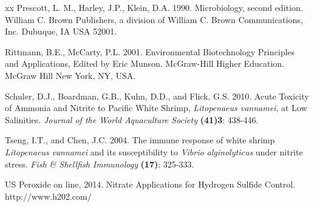 \documentclass[useAMS,usenatbib]{tellus}
\begin{document}
\begin{thebibliography}{xx}
Prescott, L. M., Harley, J.P., Klein, D.A. 1990. {Microbiology, second edition.} {William C. Brown Publishers, a division of William C. Brown Communications, Inc. Dubuque, IA USA 52001}.   

Rittmann, B.E., McCarty, P.L. 2001. {Environmental Biotechnology Principles and Applications, Edited by Eric Munson}. {McGraw-Hill Higher Education. McGraw Hill New York, NY, USA}. 

Schuler, D.J., Boardman, G.B., Kuhn, D.D., and Flick, G.S. 2010. {Acute Toxicity of Ammonia 
and Nitrite to Pacific White Shrimp, \textit{Litopenaeus vannamei}, at Low Salinities}. {\em Journal of the World Aquaculture Society} {\bf (41)3}: 438-446.

Tseng, I.T., and Chen, J.C. 2004. {The immune response of white shrimp \textit{Litopenaeus vannamei} and its susceptibility to \textit{Vibrio alginolyticus} under nitrite stress}. {\em Fish \& Shellfish Immunology} {\bf (17)}: 325-333.

US Peroxide on line, 2014. Nitrate Applications for Hydrogen Sulfide Control. http://www.h202.com/

\end{thebibliography}
\end{document}
